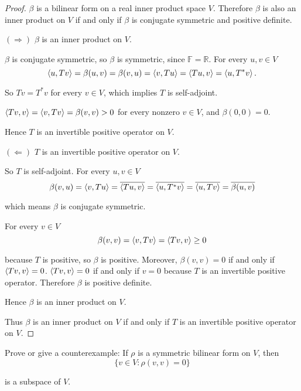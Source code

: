\begin{proof}
    $\beta$ is a bilinear form on a real inner product space $V$. Therefore $\beta$ is also an inner product on $V$ if and only if $\beta$ is conjugate symmetric and positive definite.

    $(\Rightarrow)$ $\beta$ is an inner product on $V$.

    $\beta$ is conjugate symmetric, so $\beta$ is symmetric, since $\mathbb{F} = \mathbb{R}$. For every $u, v\in V$
    \[
        \left\langle{u, Tv}\right\rangle = \beta(u, v) = \beta(v, u) = \left\langle{v, Tu}\right\rangle = \left\langle{Tu, v}\right\rangle = \left\langle{u, T^{*}v}\right\rangle.
    \]

    So $Tv = T^{*}v$ for every $v\in V$, which implies $T$ is self-adjoint.

    $\left\langle{Tv, v}\right\rangle = \left\langle{v, Tv}\right\rangle = \beta(v, v) > 0$ for every nonzero $v\in V$, and $\beta(0, 0) = 0$.

    Hence $T$ is an invertible positive operator on $V$.

    \bigskip
    $(\Leftarrow)$ $T$ is an invertible positive operator on $V$.

    So $T$ is self-adjoint. For every $u, v\in V$
    \[
        \beta(v, u) = \left\langle{v, Tu}\right\rangle = \overline{\left\langle{Tu, v}\right\rangle} = \overline{\left\langle{u, T^{*}v}\right\rangle} = \overline{\left\langle{u, Tv}\right\rangle} = \overline{\beta(u, v)}
    \]

    which means $\beta$ is conjugate symmetric.

    For every $v\in V$
    \[
        \beta(v, v) = \left\langle{v, Tv}\right\rangle = \left\langle{Tv, v}\right\rangle \geq 0
    \]

    because $T$ is positive, so $\beta$ is positive. Moreover, $\beta(v, v) = 0$ if and only if $\left\langle{Tv, v}\right\rangle = 0$. $\left\langle{Tv, v}\right\rangle = 0$ if and only if $v = 0$ because $T$ is an invertible positive operator. Therefore $\beta$ is positive definite.

    Hence $\beta$ is an inner product on $V$.

    \bigskip
    Thus $\beta$ is an inner product on $V$ if and only if $T$ is an invertible positive operator on $V$.
\end{proof}
\newpage

\begin{exercise}\label{chapter9:sectionA:exercise6}
    Prove or give a counterexample: If $\rho$ is a symmetric bilinear form on $V$, then
    \[
        \{ v\in V : \rho(v, v) = 0 \}
    \]

    is a subspace of $V$.
\end{exercise}

